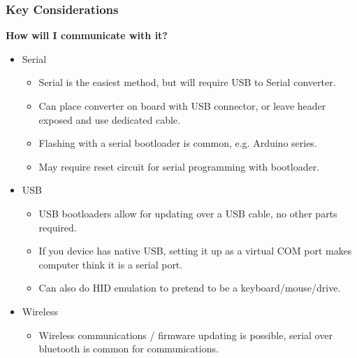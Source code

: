 \documentclass[t]{beamer}
\begin{document}
 \begin{frame}
 \frametitle{Key Considerations}
 \large{\textbf{ How will I communicate with it?}}
 \vspace{1mm}
 \begin{itemize}
 	\item Serial
 	\begin{itemize} 
 		\item Serial is the easiest method, but will require USB to Serial converter. 
 		\item Can place converter on board with USB connector, or leave header exposed and use dedicated cable.
 		\item Flashing with a serial bootloader is common, e.g. Arduino series. 
 		\item May require reset circuit for serial programming with bootloader. 
 	\end{itemize} 
 	\item USB
 	\begin{itemize}
 		\item USB bootloaders allow for updating over a USB cable, no other parts required. 
 		\item If you device has native USB, setting it up as a virtual COM port makes computer think it is a serial port. 
 		\item Can also do HID emulation to pretend to be a keyboard/mouse/drive. 
 	\end{itemize}
 	\item Wireless
 	\begin{itemize}
 		\item Wireless communications / firmware updating is possible, serial over bluetooth is common for communications. 
 	\end{itemize}
 \end{itemize}
\end{frame}

\end{document}
